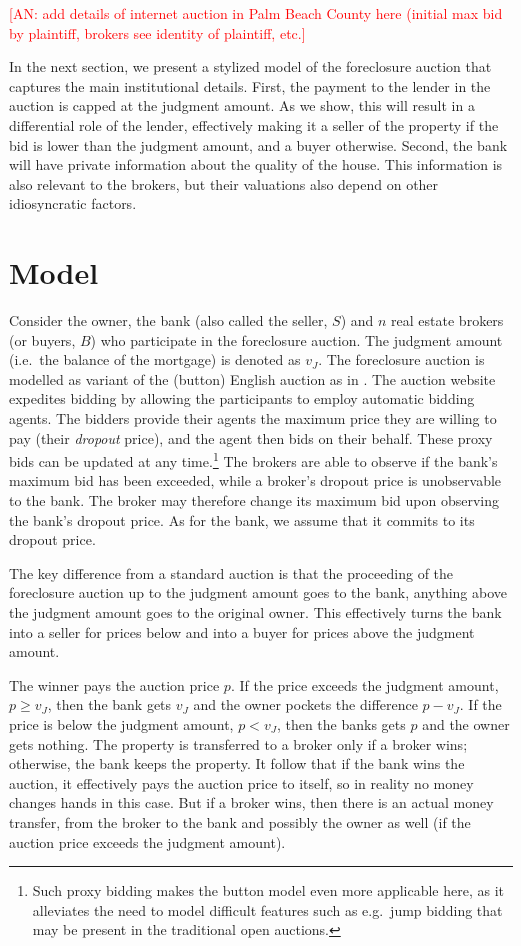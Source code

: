 \documentclass[11pt,twopage]{article}
\newcommand{\AN}[1]{\textcolor{red}{[AN: #1]}}
\begin{document}
\AN{add details of internet auction in Palm Beach County here (initial max bid by plaintiff,
brokers see identity of plaintiff, etc.}

In the next section, we present a stylized model of the foreclosure auction that captures the main institutional details. First, the payment to the lender in the auction is capped at the judgment amount. As we show, this will result in a differential role of the lender, effectively making it a seller of the property if the bid is lower than the judgment amount, and a buyer otherwise. Second, the bank will have private information about the quality of the house. This information is also relevant to the brokers, but their valuations also depend on other  idiosyncratic factors.


\section{Model}

Consider the owner, the bank (also called the seller, $S$) and $n$
real estate brokers (or buyers, $B$) who participate in the
foreclosure auction. The judgment amount (i.e.\ the balance of the
mortgage) is denoted as $v_J$. The foreclosure auction is modelled as
variant of the (button) English auction as in
\cite{milgrom1982theory}. The auction website expedites bidding by
allowing the participants to employ automatic bidding agents. The
bidders provide their agents the maximum price they are willing to pay
(their \emph{dropout} price), and the agent then bids on their
behalf. These proxy bids can be updated at any time.\footnote{Such
  proxy bidding makes the button model even more applicable here, as
  it alleviates the need to model difficult features such as e.g.\
  jump bidding that may be present in the traditional open auctions.}
The brokers are able to observe if the bank's maximum bid has been
exceeded, while a broker's dropout price is unobservable to the
bank. The broker may therefore change its maximum bid upon observing
the bank's dropout price. As for the bank, we assume that it commits
to its dropout price.

The key difference from a standard auction is that the proceeding of
the foreclosure auction up to the judgment amount goes to the bank,
anything above the judgment amount goes to the original owner. This
effectively turns the bank into a seller for prices below and into a
buyer for prices above the judgment amount.

The winner pays the auction price $p$.  If the price exceeds the
judgment amount, $p\geq v_J$, then the bank gets $v_J$ and the owner
pockets the difference $p - v_J$. If the price is below the judgment
amount, $p<v_J$, then the banks gets $p$ and the owner gets
nothing. The property is transferred to a broker only if a broker
wins; otherwise, the bank keeps the property. It follow that if the
bank wins the auction, it effectively pays the auction price to
itself, so in reality no money changes hands in this case. But if a
broker wins, then there is an actual money transfer, from the broker
to the bank and possibly the owner as well (if the auction price
exceeds the judgment amount).
\end{document}
